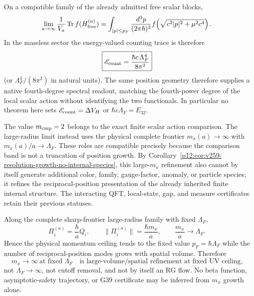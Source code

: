 \documentclass[12pt,a4paper]{article}
\begin{document}
\begin{corollary}
\label{p12:cor:free-spectral-density-at-fixed-cutoff}
On a compatible family of the already admitted free scalar blocks,
\[
 \lim_{a\to\infty}\frac1{V_a}\operatorname{Tr}f(H_{\rm free}^{(a)})
 =\int_{|p|\le p_F}\frac{d^3p}{(2\pi\hbar)^3}
 f\!\left(\sqrt{c^2|p|^2+\mu^2c^4}\right).
\]
In the massless sector the energy-valued counting trace is therefore
\[
 \boxed{
 \mathscr E_{\rm count}
 =\frac{\hbar c\,\Lambda_F^4}{8\pi^2}}
\]
(or $\Lambda_F^4/(8\pi^2)$ in natural units).  The same position geometry
therefore supplies a native fourth-degree spectral readout, matching the
fourth-power degree of the local scalar action without identifying the two
functionals.  In particular no theorem here sets
$\mathscr E_{\rm count}=\Delta V_H$ or
$\hbar c\Lambda_F=E_{32}$.
\end{corollary}

\begin{remark}
The value $m_{\rm cmp}=2$ belongs to the exact finite scalar action comparison.
The large-radius limit instead uses the physical complete frontier
$m_x(a)\to\infty$ with $m_x(a)/a\to\Lambda_F$.  These roles are compatible
precisely because the comparison band is not a truncation of position growth.
By Corollary~\ref{p12:cor:v259-resolution-growth-no-internal-species}, this
large-$m_x$ refinement also cannot by itself generate additional color,
family, gauge-factor, anomaly, or particle species; it refines the
reciprocal-position presentation of the already inherited finite internal
structure.  The interacting QFT, local-state, gap, and measure certificates
retain their previous statuses.
\end{remark}

\begin{theorem}
\label{p12:thm:v260-fixed-cutoff-not-rg}
Along the complete sharp-frontier large-radius family with fixed $\Lambda_F$,
\[
 \Pi_i^{(a)}=\frac{\hbar}{a}Q_i,
 \qquad
 \|\Pi_i^{(a)}\|=\frac{\hbar m_x}{a},
 \qquad
 \frac{m_x}{a}\longrightarrow\Lambda_F.
\]
Hence the physical momentum ceiling tends to the fixed value
$p_F=\hbar\Lambda_F$ while the number of reciprocal-position modes grows with
spatial volume.  Therefore
\[
 \boxed{
 m_x\to\infty\ \text{at fixed }\Lambda_F
 \quad\text{is large-volume/spatial refinement at fixed UV ceiling,}}
\]
not $\Lambda_F\to\infty$, not cutoff removal, and not by itself an RG flow.
No beta function, asymptotic-safety trajectory, or G39 certificate may be
inferred from $m_x$ growth alone.
\end{theorem}
\end{document}
